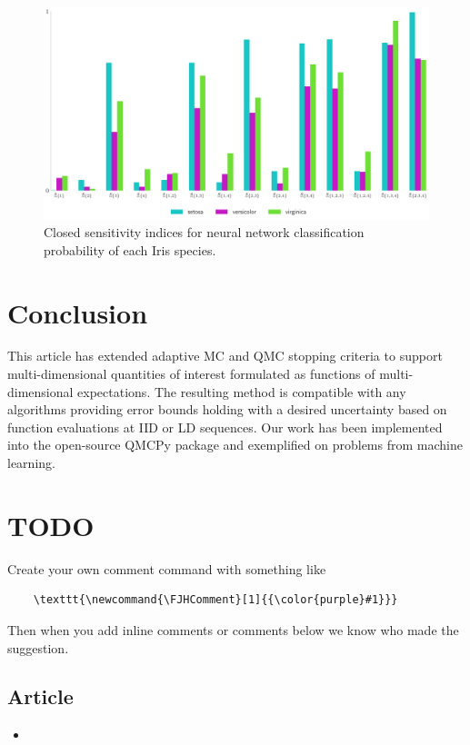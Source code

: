 \documentclass{article}[12pt]
\newcommand{\FJHComment}[1]{{\color{purple}#1}}
\begin{document}
\begin{figure}[H]
    \centering
    \includegraphics[width=.8\textwidth]{figs/nn_si.pdf}
    \caption{Closed sensitivity indices for neural network classification probability of each Iris species.}
    \label{fig:nn_si}
\end{figure}

\section{Conclusion} \label{sec:conclusions}

This article has extended adaptive MC and QMC stopping criteria to support multi-dimensional quantities of interest formulated as functions of multi-dimensional expectations. The resulting method is compatible with any algorithms providing error bounds holding with a desired uncertainty based on function evaluations at IID or LD sequences. Our work has been implemented into the open-source QMCPy package and exemplified on problems from machine learning. 

\printbibliography

\section*{TODO}

Create your own comment command with something like
\begin{verbatim}
    \texttt{\newcommand{\FJHComment}[1]{{\color{purple}#1}}}
\end{verbatim} 
Then when you add inline comments or comments below we know who made the suggestion. 

\subsection*{Article}

\begin{itemize}
    \item {}
\end{itemize}
\end{document}
